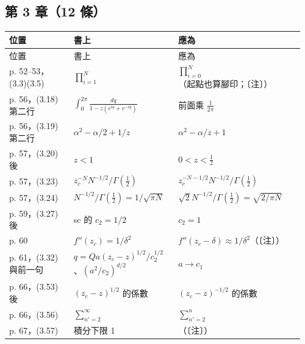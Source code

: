 \subsection{第 3 章（12 條）}
{\footnotesize\renewcommand{\arraystretch}{1.1}\setlength{\tabcolsep}{4pt}
\begin{longtable}{@{}>{\raggedright\arraybackslash}p{0.21\linewidth}>{\raggedright\arraybackslash}p{0.34\linewidth}>{\raggedright\arraybackslash}p{0.41\linewidth}@{}}
\toprule 位置 & 書上 & 應為\\ \midrule\endfirsthead
\toprule 位置 & 書上 & 應為\\ \midrule\endhead
\bottomrule\endfoot
p. 52–53，(3.3)(3.5) & $\prod_{i=1}^{N}$ & $\prod_{i=0}^{N}$（起點也算腳印；〔注〕）\\
p. 56，(3.18) 第二行 & $\int_0^{2\pi}\frac{dq}{1-z(e^{iq}+e^{-iq})}$ & 前面乘 $\frac1{2\pi}$\\
p. 56，(3.19) 第二行 & $\alpha^2-\alpha/2+1/z$ & $\alpha^2-\alpha/z+1$\\
p. 57，(3.20) 後 & $z<1$ & $0<z<\frac12$\\
p. 57，(3.23) & $z_c^{-N}N^{-1/2}/\Gamma(\frac12)$ & $z_c^{-N-1/2}N^{-1/2}/\Gamma(\frac12)$\\
p. 57，(3.24) & $N^{-1/2}/\Gamma(\frac12)=1/\sqrt{\pi N}$ & $\sqrt2N^{-1/2}/\Gamma(\frac12)=\sqrt{2/\pi N}$\\
p. 59，(3.27) 後 & sc 的 $c_2=1/2$ & $c_2=1$\\
p. 60 & $f''(z_c)=1/\delta^2$ & $f''(z_c-\delta)\approx1/\delta^2$（〔注〕）\\
p. 61，(3.32) 與前一句 & $q=Qa(z_c-z)^{1/2}/c_2^{1/2}$、$(a^2/c_2)^{d/2}$ & $a\to c_1$\\
p. 66，(3.53) 後 & $(z_c-z)^{1/2}$ 的係數 & $(z_c-z)^{-1/2}$ 的係數\\
p. 66，(3.56) & $\sum_{n'=2}^{\infty}$ & $\sum_{n'=2}^{n}$\\
p. 67，(3.57) & 積分下限 1 & 2（〔注〕）\\
\end{longtable}}

